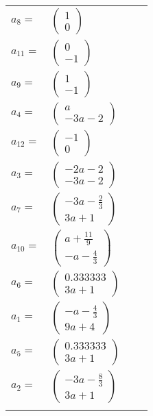 \documentclass[1p]{elsarticle_modified}
\theoremstyle{definition}
\begin{document}
\begin{tabular}{m{7pt} m{180pt} m{7pt} m{180pt} }
\flushright $a_{8}=$&$\begin{pmatrix}1\\0\end{pmatrix}$ \\
\flushright $a_{11}=$&$\begin{pmatrix}0\\-1\end{pmatrix}$ \\
\flushright $a_{9}=$&$\begin{pmatrix}1\\-1\end{pmatrix}$ \\
\flushright $a_{4}=$&$\begin{pmatrix}a\\-3 a-2\end{pmatrix}$ \\
\flushright $a_{12}=$&$\begin{pmatrix}-1\\0\end{pmatrix}$ \\
\flushright $a_{3}=$&$\begin{pmatrix}-2 a-2\\-3 a-2\end{pmatrix}$ \\
\flushright $a_{7}=$&$\begin{pmatrix}-3 a-\frac{2}{3}\\3 a+1\end{pmatrix}$ \\
\flushright $a_{10}=$&$\begin{pmatrix}a+\frac{11}{9}\\- a-\frac{4}{3}\end{pmatrix}$ \\
\flushright $a_{6}=$&$\begin{pmatrix}0.333333\\3 a+1\end{pmatrix}$ \\
\flushright $a_{1}=$&$\begin{pmatrix}- a-\frac{4}{3}\\9 a+4\end{pmatrix}$ \\
\flushright $a_{5}=$&$\begin{pmatrix}0.333333\\3 a+1\end{pmatrix}$ \\
\flushright $a_{2}=$&$\begin{pmatrix}-3 a-\frac{8}{3}\\3 a+1\end{pmatrix}$\\&\end{tabular}
\end{document}

